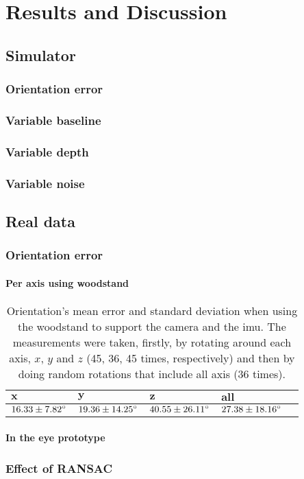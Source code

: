 
\chapter{Results and Discussion}
\label{cha4:results}

\section{Simulator}

\subsection{Orientation error}
\subsection{Variable baseline}
\subsection{Variable depth}
\subsection{Variable noise}


\section{Real data}
\subsection{Orientation error}
\subsubsection{Per axis using woodstand}

\begin{table}[]
	\centering
	\renewcommand{\arraystretch}{1.5}%
	\begin{tabular}{| l | l | l | l | l |}
		\hline
		 $\mathbf{x}$ &$\mathbf{y}$  & $\mathbf{z}$  & $\mathbf{all}$ \\
		 \hline
		 $16.33 \pm{7.82} \degree $ & 
		 $19.36 \pm{14.25} \degree$ &  
		 $40.55 \pm{26.11} \degree$ & 
		 $27.38 \pm{18.16} \degree $ \\
		\hline
	\end{tabular}
	\caption[IMU orientation's mean error and standard deviation when using the woodstand]{Orientation's mean error and standard deviation when using the woodstand to support the camera and the \acrshort{imu}. The measurements were taken, firstly, by rotating around each axis, $x$, $y$ and $z$ (45, 36, 45 times, respectively) and then by doing random rotations that include all axis (36 times).}
	\label{cha4:sec2:woodstandres}
\end{table}

\subsubsection{In the eye prototype}

\subsection{Effect of RANSAC}
